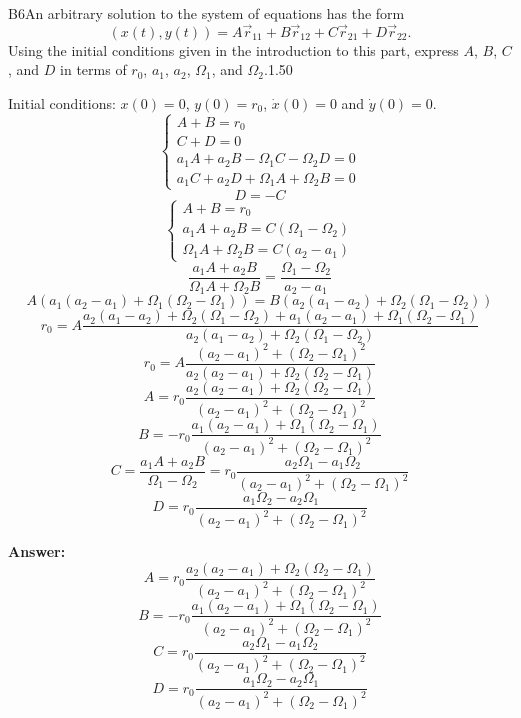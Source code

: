 \documentclass[11pt,a4paper]{article}
\begin{document}
\begin{solcard}{B6}{An arbitrary solution to the system of equations has the form $$\left(x(t), y(t)\right) = A\vec r_{11}+B\vec r_{12}+C\vec r_{21}+D\vec r_{22}.$$ Using the initial conditions given in the introduction to this part, express $A$, $B$, $C$, and $D$ in terms of $r_0$, $a_1$, $a_2$, $\Omega_1$, and $\Omega_2$.}{1.50}

Initial conditions: $x(0) = 0$, $y(0) = r_0$, $\dot x(0) = 0$ and $\dot y(0) = 0$. $$\begin{cases} A+B = r_0\\ C+D = 0\\ a_1A+a_2B-\Omega_1C-\Omega_2D=0\\ a_1C+a_2D+\Omega_1A+\Omega_2B=0 \end{cases}$$$$D = -C$$$$\begin{cases} A+B = r_0\\ a_1A+a_2B=C\left(\Omega_1-\Omega_2\right)\\ \Omega_1A+\Omega_2B=C\left(a_2-a_1\right) \end{cases}$$$$\frac{a_1A+a_2B}{\Omega_1A+\Omega_2B}=\frac{\Omega_1-\Omega_2}{a_2-a_1}$$$$A\left(a_1\left(a_2-a_1\right)+\Omega_1\left(\Omega_2-\Omega_1\right)\right)=B\left(a_2\left(a_1-a_2\right)+\Omega_2\left(\Omega_1-\Omega_2\right)\right)$$$$r_0 = A\frac{a_2\left(a_1-a_2\right)+\Omega_2\left(\Omega_1-\Omega_2\right)+a_1\left(a_2-a_1\right)+\Omega_1\left(\Omega_2-\Omega_1\right)}{a_2\left(a_1-a_2\right)+\Omega_2\left(\Omega_1-\Omega_2\right)}$$$$r_0 = A\frac{\left(a_2-a_1\right)^2+\left(\Omega_2-\Omega_1\right)^2}{a_2\left(a_2-a_1\right)+\Omega_2\left(\Omega_2-\Omega_1\right)}$$$$A = r_0 \frac{a_2\left(a_2-a_1\right)+\Omega_2\left(\Omega_2-\Omega_1\right)}{\left(a_2-a_1\right)^2+\left(\Omega_2-\Omega_1\right)^2}$$$$B = -r_0 \frac{a_1\left(a_2-a_1\right)+\Omega_1\left(\Omega_2-\Omega_1\right)}{\left(a_2-a_1\right)^2+\left(\Omega_2-\Omega_1\right)^2}$$$$C = \frac{a_1A+a_2B}{\Omega_1-\Omega_2}=r_0\frac{a_2\Omega_1-a_1\Omega_2}{\left(a_2-a_1\right)^2+\left(\Omega_2-\Omega_1\right)^2}$$$$D = r_0\frac{a_1\Omega_2-a_2\Omega_1}{\left(a_2-a_1\right)^2+\left(\Omega_2-\Omega_1\right)^2}$$

\par\smallskip\noindent\textbf{Answer:} $$A = r_0 \frac{a_2\left(a_2-a_1\right)+\Omega_2\left(\Omega_2-\Omega_1\right)}{\left(a_2-a_1\right)^2+\left(\Omega_2-\Omega_1\right)^2}$$$$B = -r_0 \frac{a_1\left(a_2-a_1\right)+\Omega_1\left(\Omega_2-\Omega_1\right)}{\left(a_2-a_1\right)^2+\left(\Omega_2-\Omega_1\right)^2}$$$$C =r_0\frac{a_2\Omega_1-a_1\Omega_2}{\left(a_2-a_1\right)^2+\left(\Omega_2-\Omega_1\right)^2}$$$$D = r_0\frac{a_1\Omega_2-a_2\Omega_1}{\left(a_2-a_1\right)^2+\left(\Omega_2-\Omega_1\right)^2}$$
\end{solcard}
\end{document}

